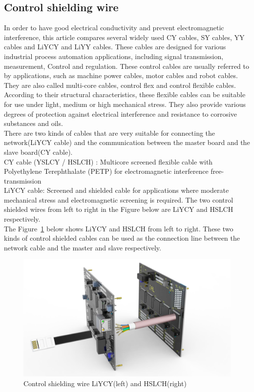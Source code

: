 \subsection{Control shielding wire}
\label{sec:Control shielding wire}
In order to have good electrical conductivity and prevent electromagnetic interference, this article compares several widely used CY cables, SY cables, YY cables and LiYCY and LiYY cables. These cables are designed for various industrial process automation applications, including signal transmission, measurement, Control and regulation. These control cables are usually referred to by applications, such as machine power cables, motor cables and robot cables. They are also called multi-core cables, control flex and control flexible cables.
\\
According to their structural characteristics, these flexible cables can be suitable for use under light, medium or high mechanical stress. They also provide various degrees of protection against electrical interference and resistance to corrosive substances and oils.
\\
There are two kinds of cables that are very suitable for connecting the network(LiYCY cable) and the communication between the master board and the slave board(CY cable).
\\
CY cable (YSLCY / HSLCH) : Multicore screened flexible cable with Polyethylene Terephthalate (PETP) for electromagnetic interference free-transmission
\\
LiYCY cable: Screened and shielded cable for applications where moderate mechanical stress and electromagnetic screening is required.
The two control shielded wires from left to right in the Figure below are LiYCY and HSLCH respectively.
\\
The Figure~\ref{fig:5.4} below shows LiYCY and HSLCH from left to right. These two kinds of control shielded cables can be used as the connection line between the network cable and the master and slave respectively.
\begin{figure}[!ht]
	\centering
	\includegraphics[width=16cm]{grafiken/5.4.pdf}
	\caption{Control shielding wire LiYCY(left) and HSLCH(right)} 
	\label{fig:5.4}
\end{figure}
\FloatBarrier
\\

